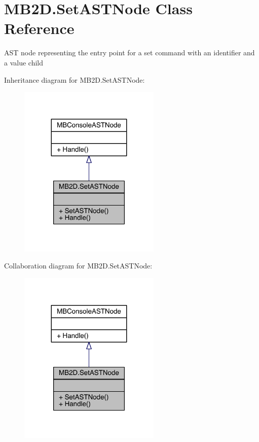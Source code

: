 \hypertarget{class_m_b2_d_1_1_set_a_s_t_node}{}\section{M\+B2\+D.\+Set\+A\+S\+T\+Node Class Reference}
\label{class_m_b2_d_1_1_set_a_s_t_node}


A\+ST node representing the entry point for a \textquotesingle{}set\textquotesingle{} command with an identifier and a value child  




Inheritance diagram for M\+B2\+D.\+Set\+A\+S\+T\+Node\+:\nopagebreak
\begin{figure}[H]
\begin{center}
\leavevmode
\includegraphics[width=191pt]{class_m_b2_d_1_1_set_a_s_t_node__inherit__graph}
\end{center}
\end{figure}


Collaboration diagram for M\+B2\+D.\+Set\+A\+S\+T\+Node\+:\nopagebreak
\begin{figure}[H]
\begin{center}
\leavevmode
\includegraphics[width=191pt]{class_m_b2_d_1_1_set_a_s_t_node__coll__graph}
\end{center}
\end{figure}
